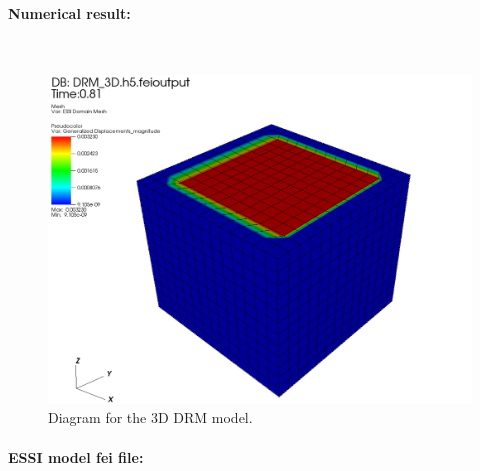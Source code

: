 \documentclass[fleqn,11pt]{article}
\begin{document}
\paragraph{Numerical result:} ~

\begin{figure}[!htb]
  \centering
  \includegraphics[width=15cm]{../Figure-files/_Chapter_Appendix_Illustrative_Examples/3d_drm_result429.png}
  \caption{Diagram for the 3D DRM model.}
  \label{fig Diagram for the 3D DRM model}
\end{figure}


\paragraph{ESSI model fei file: } ~
\end{document}

